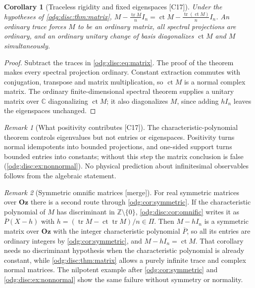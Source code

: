 \documentclass[11pt,oneside]{article}
\numberwithin{equation}{section}
\newtheorem{corollary}[corollary]{Corollary}
\theoremstyle{definition}
\theoremstyle{remark}
\newtheorem{remark}[remark]{Remark}
\newcommand{\Oz}{\mathbf{Oz}}
\newcommand{\Z}{\mathbb Z}
\newcommand{\C}{\mathbb C}
\newcommand{\ct}{\operatorname{ct}}
\newcommand{\tr}{\operatorname{tr}}
\newcommand{\src}[1]{\textup{\textsf{\small[#1]}}}
\newcommand{\mergetag}{\textup{\textsf{\small[merge]}}}
\begin{document}
\begin{corollary}[Traceless rigidity and fixed eigenspaces \src{C17}]\label{odg:disc:cor:traceless}
Under the hypotheses of \cref{odg:disc:thm:matrix},
$M-\frac{\tr M}nI_n=\ct M-\frac{\tr(\ct M)}nI_n$. An ordinary trace forces $M$ to be an
ordinary matrix, all spectral projections are ordinary, and an ordinary unitary change of
basis diagonalizes $\ct M$ and $M$ simultaneously.
\end{corollary}
\begin{proof}
Subtract the traces in \eqref{odg:disc:eq:matrix}. The proof of the theorem makes every
spectral projection ordinary. Constant extraction commutes with conjugation, transpose
and matrix multiplication, so $\ct M$ is a normal complex matrix. The ordinary
finite-dimensional spectral theorem supplies a unitary matrix over $\C$ diagonalizing
$\ct M$; it also diagonalizes $M$, since adding $hI_n$ leaves the eigenspaces unchanged.
\end{proof}

\begin{remark}[What positivity contributes \src{C17}]\label{odg:disc:rem:positivity}
The characteristic-polynomial theorem controls eigenvalues but not entries or eigenspaces.
Positivity turns normal idempotents into bounded projections, and one-sided support turns
bounded entries into constants; without this step the matrix conclusion is false
(\cref{odg:disc:ex:nonnormal}). No physical prediction about infinitesimal observables
follows from the algebraic statement.
\end{remark}

\begin{remark}[Symmetric omnific matrices \mergetag]\label{odg:disc:rem:symmetric}
For real symmetric matrices over $\Oz$ there is a second route through
\cref{odg:cor:symmetric}. If the characteristic polynomial of $M$ has discriminant in
$\Z\setminus\{0\}$, \cref{odg:disc:cor:omnific} writes it as $\overline P(X-h)$ with
$h=(\tr M-\ct\tr M)/n\in\Pi$. Then $M-hI_n$ is a symmetric matrix over $\Oz$ with the integer
characteristic polynomial $\overline P$, so all its entries are ordinary integers by
\cref{odg:cor:symmetric}, and $M-hI_n=\ct M$. That corollary needs no discriminant
hypothesis when the characteristic polynomial is already constant, while
\cref{odg:disc:thm:matrix} allows a purely infinite trace and complex normal matrices. The
nilpotent example after \cref{odg:cor:symmetric} and \cref{odg:disc:ex:nonnormal} show the
same failure without symmetry or normality.
\end{remark}
\end{document}
